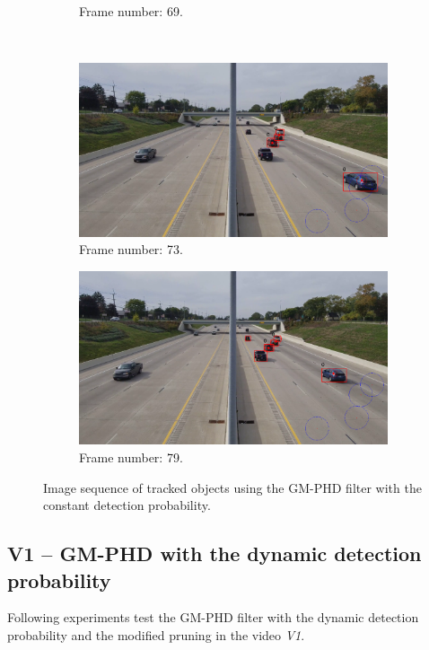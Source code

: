 \begin{figure}[H]
\begin{subfigure}{0.48\textwidth}
        \caption{Frame number: 69.}
        \label{fig:E1-V1-S0:06}
    \end{subfigure}
    \\
    \begin{subfigure}{0.48\textwidth}
        \centering
        \includegraphics[width=\linewidth]{../../../experiments/E1/V1/noPd/73}
        \caption{Frame number: 73.}
        \label{fig:E1-V1-S0:07}
    \end{subfigure}
    \begin{subfigure}{0.48\textwidth}
        \centering
        \includegraphics[width=\linewidth]{../../../experiments/E1/V1/noPd/79}
        \caption{Frame number: 79.}
        \label{fig:E1-V1-S0:08}
    \end{subfigure}
    \caption{Image sequence of tracked objects using the GM-PHD filter with the constant detection probability.}
    \label{fig:E1-V1-S0}
\end{figure}

\subsection{V1 -- GM-PHD with the dynamic detection probability}
Following experiments test the GM-PHD filter with the dynamic detection probability and the modified pruning in the
video \textit{V1}.
